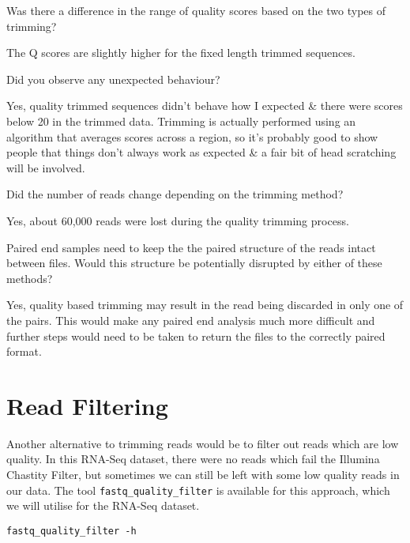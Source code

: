 \begin{questions}
Was there a difference in the range of quality scores based on the two types of trimming? \\
\begin{answer}
The Q scores are slightly higher for the fixed length trimmed sequences. \\
\end{answer}

Did you observe any unexpected behaviour? \\
\begin{answer}
Yes, quality trimmed sequences didn't behave how I expected \& there were scores below 20 in the trimmed data.
Trimming is actually performed using an algorithm that averages scores across a region, so it's probably good to show people that things don't always work as expected \& a fair bit of head scratching will be involved. \\
\end{answer}

Did the number of reads change depending on the trimming method? \\
\begin{answer}
Yes, about 60,000 reads were lost during the quality trimming process. \\
\end{answer}

Paired end samples need to keep the the paired structure of the reads intact between files.
Would this structure be potentially disrupted by either of these methods? \\
\begin{answer}
Yes, quality based trimming may result in the read being discarded in only one of the pairs. 
This would make any paired end analysis much more difficult and further steps would need to be taken to return the files to the correctly paired format.\\
\end{answer}
\end{questions}

\section{Read Filtering}
Another alternative to trimming reads would be to filter out reads which are low quality.
In this RNA-Seq dataset, there were no reads which fail the Illumina Chastity Filter, but sometimes we can still be left with some low quality reads in our data. 
The tool \texttt{fastq_quality_filter} is available for this approach, which we will utilise for the RNA-Seq dataset.
\begin{lstlisting}
fastq_quality_filter -h
\end{lstlisting}

